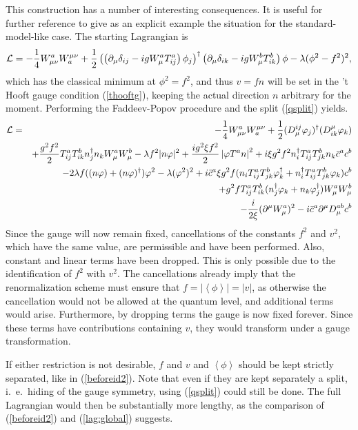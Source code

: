 \documentclass[final,12pt,3p,longtitle]{elsarticle}
\newcommand*{\La}{{\cal{L}}}
\newcommand*{\no}{\noindent}
\newcommand*{\bea}{\begin{eqnarray}}
\newcommand*{\eea}{\end{eqnarray}}
\newcommand*{\be}{\begin{equation}}
\newcommand*{\ee}{\end{equation}}
\newcommand*{\pd}{\partial}
\newcommand*{\pdm}{\pd_{\mu}}
\newcommand*{\pref}[1]{(\ref{#1})}
\newcommand*{\mn}{{\mu\nu}}
\newcommand*{\1}{1\!\!\!\bot}
\newcommand*{\la}{\left\langle}
\newcommand*{\ra}{\right\rangle}
\begin{document}
This construction has a number of interesting consequences. It is useful for further reference to give as an explicit example the situation for the standard-model-like case. The starting Lagrangian is
\be
\La=-\frac{1}{4}W_\mn^a W_a^\mn+\frac{1}{2}\left(\left(\pdm\delta_{ij}-igW_\mu^aT^a_{ij}\right)\phi_j\right)^\dagger\left(\pdm\delta_{ik}-igW_\mu^bT^b_{ik}\right)\phi-\lambda(\phi^2-f^2)^2\label{higgsyml},
\ee
\no which has the classical minimum at $\phi^2=f^2$, and thus $v=fn$ will be set in the 't Hooft gauge condition \pref{thooftg}, keeping the actual direction $n$ arbitrary for the moment. Performing the Faddeev-Popov procedure and the split \pref{qsplit} yields.
\bea
\La&=&-\frac{1}{4}W_\mn^a W_a^\mn+\frac{1}{2}(D_\mu^{ij}\varphi_j)^\dagger(D_{ik}^\mu\varphi_k)\label{smkin}\\
&&+\frac{g^2f^2}{2}T^a_{ij}T^b_{ik}n_j^\dagger n_kW_\mu^a W_\mu^b-\lambda f^2|n\varphi|^2+\frac{ig^2\xi f^2}{2}\left|\varphi T^an\right|^2+i\xi g^2f^2 n_i^\dagger T^a_{ij}T^b_{jk}n_k\bar{c}^a c^b\label{smmass}\\
&&-2\lambda f((n\varphi)+(n\varphi)^\dagger)\varphi^2-\lambda(\varphi^2)^2+i\bar{c}^a\xi g^2 f(n_iT^a_{ij}T^b_{jk}\varphi_k^\dagger+n_i^\dagger T^a_{ij}T^b_{jk}\varphi_k) c^b\label{smint1}\\
&&+g^2 fT^a_{ij}T^b_{ik}(n^\dagger_j\varphi_k+n_k\varphi_j^\dagger)W_\mu^aW_\mu^b\label{smint2}\\
&&-\frac{i}{2\xi}(\pd^\mu W_\mu^a)^2-i\bar{c}^a\pd^\mu D_\mu^{ab}c^b\label{smgf}
\eea
\no Since the gauge will now remain fixed, cancellations of the constants $f^2$ and $v^2$, which have the same value, are permissible and have been performed. Also, constant and linear terms have been dropped. This is only possible due to the identification of $f^2$ with $v^2$. The cancellations already imply that the renormalization scheme must ensure that $f=|\la\phi\ra|=|v|$, as otherwise the cancellation would not be allowed at the quantum level, and additional terms would arise. Furthermore, by dropping terms the gauge is now fixed forever. Since these terms have contributions containing $v$, they would transform under a gauge transformation.

If either restriction is not desirable, $f$ and $v$ and $\la\phi\ra$ should be kept strictly separated, like in \pref{beforeid2}. Note that even if they are kept separately a split, i.\ e.\ hiding of the gauge symmetry, using \pref{qsplit} could still be done. The full Lagrangian would then be substantially more lengthy, as the comparison of \pref{beforeid2} and \pref{lag:global} suggests.
\end{document}
